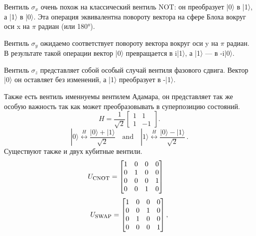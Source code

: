 \documentclass[a4paper,14pt]{extreport} %
\newcommand{\ket}[1]{|#1\rangle}
\begin{document}
Вентиль $\sigma_x$ очень похож на классический вентиль NOT: он преобразует |0〉 в |1〉, а |1〉 в |0〉. Эта операция эквивалентна повороту вектора на сфере Блоха вокруг оси x на $\pi$  радиан (или 180°).

Вентиль $\sigma_y$ ожидаемо соответствует повороту вектора вокруг оси y на $\pi$ радиан. В результате такой операции вектор |0〉 превращается в i|1〉, а |1〉 — в -i|0〉.

Вентиль $\sigma_z$ представляет собой особый случай вентиля фазового сдвига. Вектор |0〉 он оставляет без изменений, а |1〉 преобразует в -|1〉.

Также есть вентиль именнуемы вентилем Адамара, он представляет так же особую важность так как может преобразовывать в суперпозицию состояний.
%
\begin{equation}
H = \frac{1}{\sqrt{2}} \begin{bmatrix} 1 & 1 \\ 1 & -1 \end{bmatrix}.
\end{equation}
%
\begin{equation}
\ket{0} \stackrel{\textstyle H}{\longleftrightarrow} \frac{\ket{0}+\ket{1}}{\sqrt{2}} 
\quad \mbox{and} \quad
\ket{1} \stackrel{\textstyle H}{\longleftrightarrow} \frac{\ket{0}-\ket{1}}{\sqrt{2}} \,.
\label{eq:Had_effect}
\end{equation}
%
Существуют также и двух кубитные вентили.
\begin{equation}
    U_{\mbox{\sc cnot}} = \begin{bmatrix} 1 & 0 & 0 & 0 \\ 
                                            0 & 1 & 0 & 0 \\ 
                                            0 & 0 & 0 & 1 \\ 
                                            0 & 0 & 1 & 0 \end{bmatrix} \quad
\end{equation}
\begin{equation}
U_{\mbox{\sc swap}} = \begin{bmatrix} 1 & 0 & 0 & 0 \\ 
                                       0 & 0 & 1 & 0 \\ 
                                       0 & 1 & 0 & 0 \\ 
                                       0 & 0 & 0 & 1 \end{bmatrix},
\end{equation}
\end{document}
